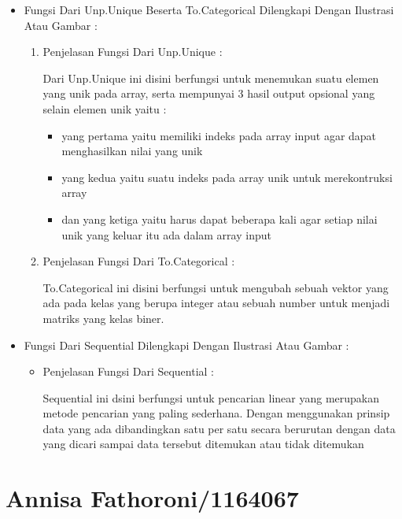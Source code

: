 \begin{enumerate}
\begin{itemize}
\item Fungsi Dari Unp.Unique Beserta To.Categorical Dilengkapi Dengan Ilustrasi Atau Gambar :
\begin{enumerate}
\item Penjelasan Fungsi Dari Unp.Unique :
\par  Dari Unp.Unique ini disini berfungsi untuk menemukan suatu elemen yang unik pada array, serta mempunyai 3 hasil output opsional yang selain elemen unik yaitu :
\begin{itemize}
\item yang pertama yaitu memiliki indeks pada array input agar dapat menghasilkan nilai yang unik
\item yang kedua yaitu suatu indeks pada array unik untuk merekontruksi array
\item dan yang ketiga yaitu harus dapat beberapa kali agar setiap nilai unik yang keluar itu ada dalam array input
\end{itemize}
\par
\par
\item Penjelasan Fungsi Dari To.Categorical :
\par To.Categorical ini disini berfungsi untuk mengubah sebuah vektor yang ada pada kelas yang berupa integer atau sebuah number untuk menjadi matriks yang kelas biner.
\par
\par
\end{enumerate}
\par
\par
\item Fungsi Dari Sequential Dilengkapi Dengan Ilustrasi Atau Gambar :
\begin{itemize}
\item Penjelasan Fungsi Dari Sequential :
\par Sequential ini dsini berfungsi untuk pencarian linear yang merupakan metode pencarian yang paling sederhana. Dengan menggunakan prinsip data yang ada dibandingkan satu per satu secara berurutan dengan data yang dicari sampai data tersebut ditemukan atau tidak ditemukan
\par
\par
\end{itemize}
\end{itemize}
\end{enumerate}

\section{Annisa Fathoroni/1164067}
